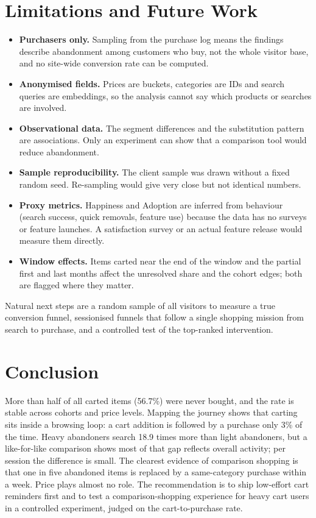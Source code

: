 \documentclass[11pt, a4paper]{article}
\begin{document}
\section{Limitations and Future Work}
\begin{itemize}
  \item \textbf{Purchasers only.} Sampling from the purchase log means the findings describe abandonment among customers who buy, not the whole visitor base, and no site-wide conversion rate can be computed.
  \item \textbf{Anonymised fields.} Prices are buckets, categories are IDs and search queries are embeddings, so the analysis cannot say which products or searches are involved.
  \item \textbf{Observational data.} The segment differences and the substitution pattern are associations. Only an experiment can show that a comparison tool would reduce abandonment.
  \item \textbf{Sample reproducibility.} The client sample was drawn without a fixed random seed. Re-sampling would give very close but not identical numbers.
  \item \textbf{Proxy metrics.} Happiness and Adoption are inferred from behaviour (search success, quick removals, feature use) because the data has no surveys or feature launches. A satisfaction survey or an actual feature release would measure them directly.
  \item \textbf{Window effects.} Items carted near the end of the window and the partial first and last months affect the unresolved share and the cohort edges; both are flagged where they matter.
\end{itemize}
Natural next steps are a random sample of all visitors to measure a true conversion funnel, sessionised funnels that follow a single shopping mission from search to purchase, and a controlled test of the top-ranked intervention.

\section{Conclusion}
More than half of all carted items (56.7\%) were never bought, and the rate is stable across cohorts and price levels. Mapping the journey shows that carting sits inside a browsing loop: a cart addition is followed by a purchase only 3\% of the time. Heavy abandoners search 18.9 times more than light abandoners, but a like-for-like comparison shows most of that gap reflects overall activity; per session the difference is small. The clearest evidence of comparison shopping is that one in five abandoned items is replaced by a same-category purchase within a week. Price plays almost no role. The recommendation is to ship low-effort cart reminders first and to test a comparison-shopping experience for heavy cart users in a controlled experiment, judged on the cart-to-purchase rate.
\end{document}
